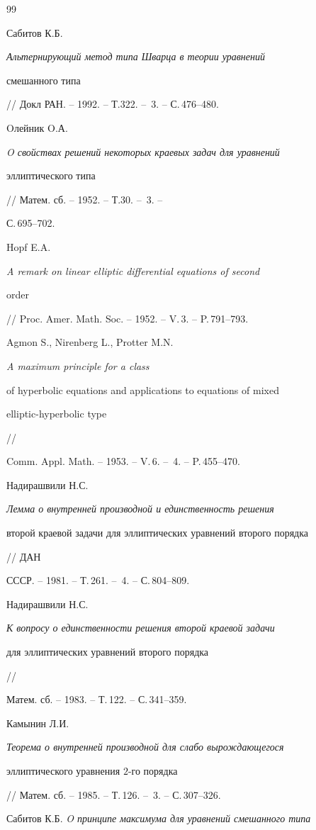 \begin{thebibliography}{99}


Сабитов К.Б. {\em Альтернирующий метод типа Шварца в теории уравнений


смешанного типа} // Докл РАН. -- 1992. -- Т.322. -- \No\,3. -- С.\,476--480.




Oлейник O.А. {\em O свойствах решений некоторых краевых задач для уравнений 


эллиптического типа} // Матем. сб. -- 1952. -- Т.30. -- \No\,3. --


С.\,695--702.




Hopf E.A. {\em A remark on linear elliptic differential equations of second


order} // Proc. Amer. Math. Soc. -- 1952. -- V.\,3. -- P.\,791--793.




Agmon S., Nirenberg L., Protter M.N. {\em A maximum principle for a class


of hyperbolic equations and applications to equations of mixed


elliptic-hyperbolic type} // 


Comm. Appl. Math. -- 1953. -- V.\,6. -- \No\,4. -- P.\,455--470.




Надирашвили Н.С. {\em Лемма о внутренней производной и единственность решения 


второй краевой задачи для эллиптических уравнений второго порядка} // ДАН


СССР. -- 1981. -- Т.\,261. -- \No\,4. -- С.\,804--809.




Надирашвили Н.С. {\em К вопросу о единственности решения второй краевой задачи 


для эллиптических уравнений второго порядка} //


Матем. сб. -- 1983. -- Т.\,122. -- С.\,341--359.




Камынин Л.И. {\em Теорема о внутренней производной для слабо вырождающегося 


эллиптического уравнения $2$-го порядка}


// Матем. сб. -- 1985. -- Т.\,126. -- \No\,3. -- С.\,307--326.




Сабитов К.Б. {\em O принципе максимума для уравнений смешанного типа}



\end{thebibliography}
